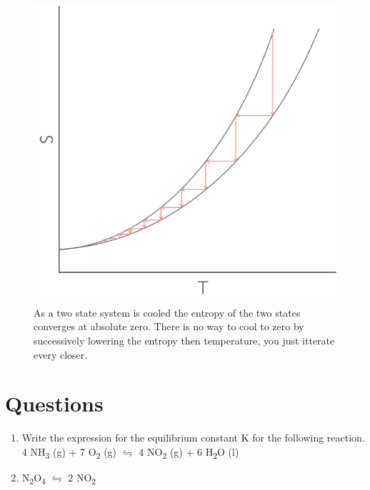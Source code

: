 \documentclass[
]{book}
\begin{document}
\begin{figure}

{\centering \includegraphics[width=1\linewidth]{images/cooling} 

}

\caption{As a two state system is cooled the entropy of the two states converges at absolute zero. There is no way to cool to zero by successively lowering the entropy then temperature, you just itterate every closer.}\label{fig:cooling}
\end{figure}

\hypertarget{sec:w4p2question}{%
\section{Questions}\label{sec:w4p2question}}

\begin{enumerate}
\def\labelenumi{\arabic{enumi}.}
\item
  Write the expression for the equilibrium constant K for the following reaction.
  4 NH\textsubscript{3} (g) + 7 O\textsubscript{2} (g) \(\leftrightharpoons\) 4 NO\textsubscript{2} (g) + 6 H\textsubscript{2}O (l)
\item
  N\textsubscript{2}O\textsubscript{4} \(\leftrightharpoons\) 2 NO\textsubscript{2}
\end{enumerate}
\end{document}
